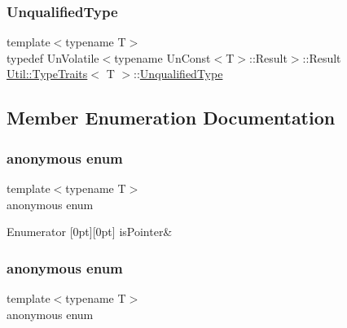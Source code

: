 \mbox{\label{classUtil_1_1TypeTraits_a9d25b7cafbc7acafa3275b5fe5a04ee0}} 
\subsubsection{\texorpdfstring{UnqualifiedType}{UnqualifiedType}\hspace{0.1cm}{\footnotesize\ttfamily [2/2]}}
{\footnotesize\ttfamily template$<$typename T$>$ \\
typedef Un\+Volatile$<$typename Un\+Const$<$T$>$\+::Result$>$\+::Result \mbox{\hyperlink{classUtil_1_1TypeTraits}{Util\+::\+Type\+Traits}}$<$ T $>$\+::\mbox{\hyperlink{classUtil_1_1TypeTraits_a9d25b7cafbc7acafa3275b5fe5a04ee0}{Unqualified\+Type}}}



\subsection{Member Enumeration Documentation}
\mbox{\label{classUtil_1_1TypeTraits_a72511c3895a8d772113e5ba68b4214d5}} 
\subsubsection{\texorpdfstring{anonymous enum}{anonymous enum}}
{\footnotesize\ttfamily template$<$typename T$>$ \\
anonymous enum}

\begin{DoxyEnumFields}{Enumerator}
[0pt][0pt]{}\mbox{\label{classUtil_1_1TypeTraits_ad589492a3d9a9a4fd5154de3efb032c1a0813f58ed7af0a00a07d0ba641cc3bba}} 
is\+Pointer&\\
\hline

\end{DoxyEnumFields}
\mbox{\label{classUtil_1_1TypeTraits_a1fc6c404cd2f4b1f1aad6e637ba2593c}} 
\subsubsection{\texorpdfstring{anonymous enum}{anonymous enum}}
{\footnotesize\ttfamily template$<$typename T$>$ \\
anonymous enum}


